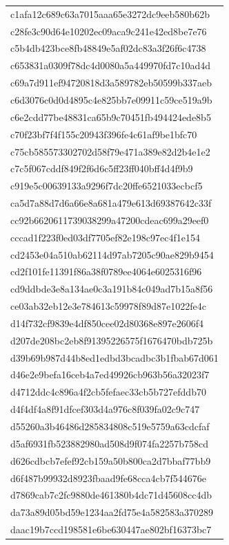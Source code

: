 \begin{tabular}{l}
c1afa12c689c63a7015aaa65e3272dc9eeb580b62b \\
c28fe3c90d64e10202ec09aca9c241e42ed8be7e76 \\
c5b4db423bce8fb48849e5af02dc83a3f26f6c4738 \\
c653831a0309f78dc4d0080a5a449970fd7c10ad4d \\
c69a7d911ef94720818d3a589782eb50599b337aeb \\
c6d3076c0d0d4895c4e825bb7e09911c59ce519a9b \\
c6e2cdd77be48831ca65b9c70451fb494424ede8b5 \\
c70f23bf7f4f155c20943f396fe4c61af9be1bfc70 \\
c75cb585573302702d58f79e471a389e82d2b4e1e2 \\
c7c5f067cddf849f2f6d6c5ff23ff040bff4d4f9b9 \\
c919e5c00639133a9296f7dc20ffe6521033ecbcf5 \\
ca5d7a88d7d6a66e8a681a479e613d69387642c33f \\
cc92b6620611739038299a47200cdeac699a29eef0 \\
cccad1f223f0ed03df7705ef82e198c97ec4f1e154 \\
cd2453e04a510ab62114d97ab7205c90ae829b9454 \\
cd2f101fe11391f86a38f0789ee4064e6025316f96 \\
cd9ddbde3e8a134ae0c3a191b84c049ad7b15a8f56 \\
ce03ab32eb12e3e784613c59978f89d87e1022fe4c \\
d14f732cf9839e4df850cee02d80368e897e2606f4 \\
d207de208bc2eb8f91395226575f1676470bdb725b \\
d39b69b987d44b8ed1edbd3bcadbc3b1fbab67d061 \\
d46e2e9befa16ceb4a7ed49926cb963b56a32023f7 \\
d4712ddc4c896a4f2cb5fefaec33cb5b727efddb70 \\
d4f4df4a8f91dfcef303d4a976c8f039fa02c9c747 \\
d55260a3b46486d285834808c519e5759a63cdcfaf \\
d5af6931fb523882980ad508d9f074fa2257b758cd \\
d626cdbcb7efef92cb159a50b800ca2d7bbaf77bb9 \\
d6f487b99932d8923fbaad9fe68cca4cb7f544676e \\
d7869cab7c2fc9880de461380b4dc71d45608cc4db \\
da73a89d05bd59e1234aa2fd75e4a582583a370289 \\
daac19b7ccd198581e6be630447ae802bf16373bc7 \\

\end{tabular}
